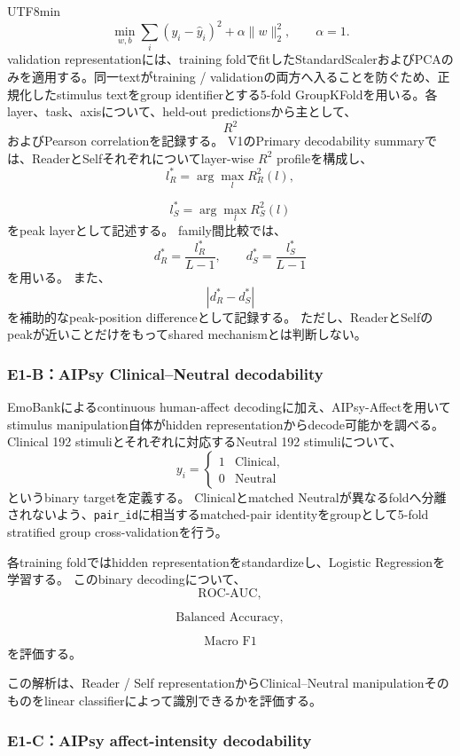 \documentclass{article} %
\begin{document}
\begin{CJK*}{UTF8}{min}
\[
\min_{w,b}
\sum_i
(y_i-\hat y_i)^2
+
\alpha\|w\|_2^2,
\qquad
\alpha=1.
\]
validation representationには、training foldでfitしたStandardScalerおよびPCAのみを適用する。同一textがtraining / validationの両方へ入ることを防ぐため、正規化したstimulus textをgroup identifierとする5-fold GroupKFoldを用いる。各layer、task、axisについて、held-out predictionsから主として、
\[
R^2
\]
およびPearson correlationを記録する。
V1のPrimary decodability summaryでは、ReaderとSelfそれぞれについてlayer-wise \(R^2\) profileを構成し、
\[
l_R^{*}
=
\arg\max_l R_R^2(l),
\]

\[
l_S^{*}
=
\arg\max_l R_S^2(l)
\]
をpeak layerとして記述する。
family間比較では、
\[
d_R^{*}
=
\frac{l_R^{*}}{L-1},
\qquad
d_S^{*}
=
\frac{l_S^{*}}{L-1}
\]
を用いる。
また、
\[
|d_R^{*}-d_S^{*}|
\]
を補助的なpeak-position differenceとして記録する。
ただし、ReaderとSelfのpeakが近いことだけをもってshared mechanismとは判断しない。


\subsubsection{E1-B：AIPsy Clinical--Neutral decodability}

EmoBankによるcontinuous human-affect decodingに加え、AIPsy-Affectを用いて
stimulus manipulation自体がhidden representationからdecode可能かを調べる。
Clinical 192 stimuliとそれぞれに対応するNeutral 192 stimuliについて、
\[
y_i
=
\begin{cases}
1 & \text{Clinical},\\
0 & \text{Neutral}
\end{cases}
\]
というbinary targetを定義する。
Clinicalとmatched Neutralが異なるfoldへ分離されないよう、\texttt{pair\_id}に相当するmatched-pair identityをgroupとして5-fold stratified group cross-validationを行う。

各training foldではhidden representationをstandardizeし、Logistic Regressionを学習する。
このbinary decodingについて、
\[
\text{ROC-AUC},
\]

\[
\text{Balanced Accuracy},
\]

\[
\text{Macro F1}
\]
を評価する。

この解析は、Reader / Self representationからClinical--Neutral manipulationそのものをlinear classifierによって識別できるかを評価する。


\subsubsection{E1-C：AIPsy affect-intensity decodability}


\end{CJK*}
\end{document}
